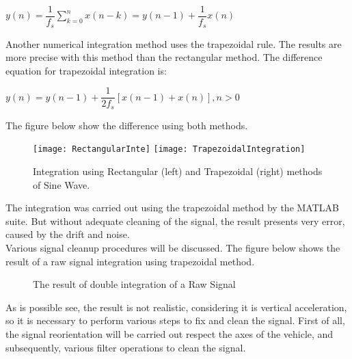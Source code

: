\documentclass[tesi]{subfiles}
\begin{document}
\begin{center}
$y(n) = \dfrac{1}{f_{s}} \sum_{k=0}^{n} x(n-k) = y(n-1) + \dfrac{1}{f_{s}} x(n)$
\end{center}

\noindent Another numerical integration method uses the trapezoidal rule. 
The results are more precise with this method than the rectangular method. The difference equation for trapezoidal integration is:

\begin{center}
$y(n) = y(n-1) + \dfrac{1}{2 f_{s}}[x(n-1) + x(n)], n > 0$
\end{center}

The figure below show the difference using both methods.

\vspace{0.35cm}
\begin{figure}[ht]
\centering
\texttt{[image: RectangularInte]}
\hspace{0.5cm}
\texttt{[image: TrapezoidalIntegration]}
\caption{Integration using Rectangular (left) and Trapezoidal (right) methods of Sine Wave.}
\label{fig:Rectangular and Trapezoidal Integration}
\end{figure}

\noindent The integration was carried out using the trapezoidal method by the MATLAB suite. But without adequate cleaning of the signal, the result presents very error, caused by the drift and noise. \\
Various signal cleanup procedures will be discussed. The figure below shows the result of a raw signal integration using trapezoidal method.

\begin{figure}
  \centering
  

  \caption{The result of double integration of a Raw Signal}
  \label{fig:Integration of Raw Data}
\end{figure}
\clearpage

\noindent As is possible see, the result is not realistic, considering it is vertical acceleration, so it is necessary to perform various steps to fix and clean the signal. First of all, the signal reorientation will be carried out respect the axes of the vehicle, and subsequently, various filter operations to clean the signal.
\end{document}
